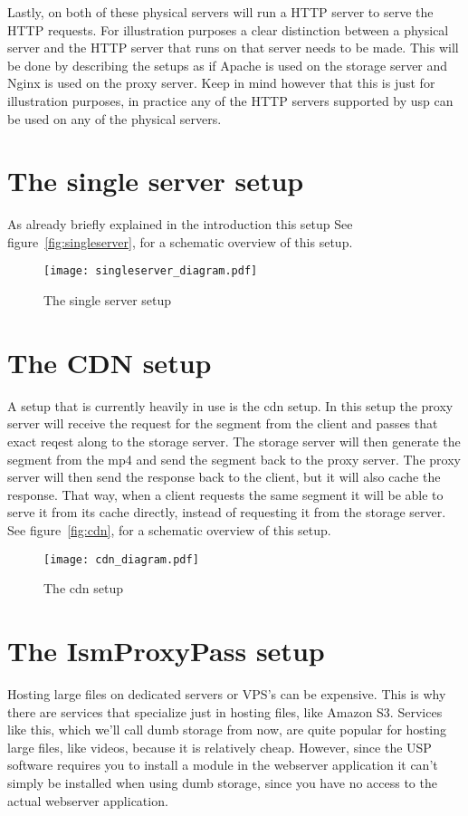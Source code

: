 \documentclass[twoside,openright]{uva-bachelor-thesis}
\begin{document}
Lastly, on both of these physical servers will run a HTTP server to serve the
HTTP requests. For illustration purposes a clear distinction between a
physical server and the HTTP server that runs on that server needs to be made.
This will be done by describing the setups as if Apache is used on the storage
server and Nginx is used on the proxy server. Keep in mind however that this is
just for illustration purposes, in practice any of the HTTP servers supported by
\gls{usp} can be used on any of the physical servers.


\section{The single server setup}
As already briefly explained in the introduction this setup
See figure~\vref{fig:singleserver}, for a schematic overview of this setup.

\begin{figure}
    \texttt{[image: singleserver\_diagram.pdf]}
    \caption{The single server setup}\label{fig:singleserver}
\end{figure}

\section{The CDN setup}
A setup that is currently heavily in use is the \gls{cdn} setup. In
this setup the proxy server will receive the request for the segment
from the client and passes that exact reqest along to the storage server. The
storage server will then generate the segment from the mp4 and send the segment
back to the proxy server.  The proxy server will then send the response back to
the client, but it will also cache the response. That way, when a client
requests the same segment it will be able to serve it from its cache directly,
instead of requesting it from the storage server.
See figure~\vref{fig:cdn}, for a schematic overview of this setup.
\begin{figure}
    \texttt{[image: cdn\_diagram.pdf]}
    \caption{The \gls{cdn} setup}\label{fig:cdn}
\end{figure}



\section{The IsmProxyPass setup}

Hosting large files on dedicated servers or VPS’s can be expensive. This is why
there are services that specialize just in hosting files, like Amazon S3.
Services like this, which we’ll call dumb storage from now, are quite popular
for hosting large files, like videos, because it is relatively cheap. However,
since the USP software requires you to install a module in the webserver
application it can’t simply be installed when using dumb storage, since you have
no access to the actual webserver application.
\end{document}
